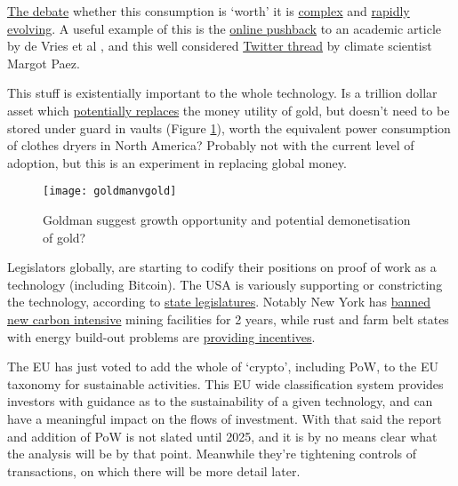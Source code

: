 \href{https://www.youtube.com/watch?v=6LP8G-oZnEs}{The debate} whether this consumption is `worth' it is \href{https://www.utilitydive.com/news/bitcoin-mining-as-a-grid-resource-its-complicated/617896/}{complex} and \href{https://www.aei.org/technology-and-innovation/no-hearing-on-bitcoins-energy-use-is-complete-without-nic-carter/}{rapidly evolving}. A useful example of this is the \href{https://www.zerohedge.com/crypto/questionable-ethics-anti-bitcoin-esg-junk-science}{online pushback} to an academic article by de Vries et al \cite{de2022revisiting}, and this well considered \href{https://twitter.com/jyn_urso/status/1508899761319038983}{Twitter thread} by climate scientist Margot Paez.\par 
This stuff is existentially important to the whole technology. Is a trillion dollar asset which \href{https://www.theheldreport.com/p/bitcoin-vs-gold}{potentially replaces} the money utility of gold, but doesn't need to be stored under guard in vaults (Figure \ref{fig:goldmanVgold}), worth the equivalent power consumption of clothes dryers in North America? Probably not with the current level of adoption, but this is an experiment in replacing global money.\par
\begin{figure}
  \centering
    \texttt{[image: goldmanvgold]}
  \caption{Goldman suggest growth opportunity and potential demonetisation of gold?}
  \label{fig:goldmanVgold}
\end{figure}
Legislators globally, are starting to codify their positions on proof of work as a technology (including Bitcoin). The USA is variously supporting or constricting the technology, according to \href{https://www.ncsl.org/research/financial-services-and-commerce/cryptocurrency-2021-legislation.aspx}{state legislatures}. Notably New York has \href{https://www.nysenate.gov/legislation/bills/2021/A7389}{banned new carbon intensive} mining facilities for 2 years, while rust and farm belt states with energy build-out problems are \href{https://financialpost.com/fp-finance/cryptocurrency/texas-governor-abbott-turns-to-bitcoin-miners-to-bolster-the-grid-and-his-re-election}{providing incentives}. \par
The EU has just voted to add the whole of `crypto', including PoW, to the EU taxonomy for sustainable activities. This EU wide classification system provides investors with guidance as to the sustainability of a given technology, and can have a meaningful impact on the flows of investment. With that said the report and addition of PoW is not slated until 2025, and it is by no means clear what the analysis will be by that point. Meanwhile they're tightening controls of transactions, on which there will be more detail later.  
